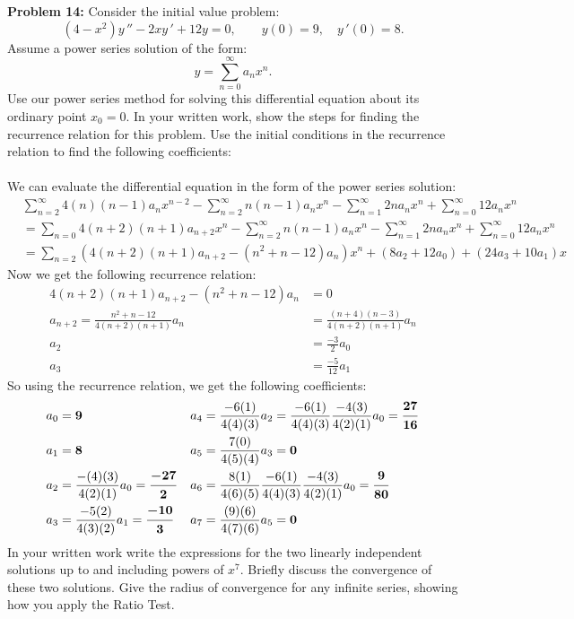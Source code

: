 \documentclass[12pt]{article}
\begin{document}
\noindent \textbf{Problem 14: }Consider the initial value problem:
	$$
	(4 - x^2)y\,'' - 2xy\,' + 12 y = 0, \qquad y(0) = 9, \quad y\,'(0) = 8.
	$$
Assume a power series solution of the form:
	$$
	y = \sum_{n=0}^{\infty} a_n x^n .
	$$
Use our power series method for solving this differential equation about its ordinary point $x_0 = 0$. In your written work, show the steps for finding the recurrence relation for this problem. Use the initial conditions in the recurrence relation to find the following coefficients:		
\\ \\
We can evaluate the differential equation in the form of the power series solution:
	\begin{align*}
		&\sum_{n=2}^{\infty} 4(n)(n-1)a_nx^{n-2} - \sum_{n=2}^{\infty} n(n-1)a_nx^n - \sum_{n=1}^{\infty} 2na_nx^n + \sum_{n=0}^{\infty} 12a_nx^n \\
		&= \sum_{n=0}4(n+2)(n+1)a_{n+2}x^n - \sum_{n=2}^{\infty} n(n-1)a_nx^n - \sum_{n=1}^{\infty} 2na_nx^n + \sum_{n=0}^{\infty} 12a_nx^n \\
		&= \sum_{n=2} (4(n+2)(n+1)a_{n+2} - (n^2 + n - 12)a_n)x^n + (8a_2 + 12a_0) + (24a_3 + 10a_1)x
	\end{align*}
Now we get the following recurrence relation:
	\begin{align*}
		4(n+2)(n+1)a_{n+2} - (n^2 + n - 12)a_n &= 0 \\
		a_{n+2} = \frac{n^2 + n - 12}{4(n+2)(n+1)}a_n &= \frac{(n+4)(n-3)}{4(n+2)(n+1)}a_n \\
		a_2 &= \frac{-3}{2}a_0 \\
		a_3 &= \frac{-5}{12}a_1
	\end{align*}
So using the recurrence relation, we get the following coefficients:
	\begin{align*}
		a_0 &= \text{\boldmath $9$} & a_4 &= \frac{-6(1)}{4(4)(3)}a_2 = \frac{-6(1)}{4(4)(3)}\frac{-4(3)}{4(2)(1)}a_0 = \text{\boldmath $\frac{27}{16}$}\\
		a_1 &= \text{\boldmath $8$} & a_5 &= \frac{7(0)}{4(5)(4)}a_3 =\text{\boldmath $ 0$}\\
		a_2 &= \frac{-(4)(3)}{4(2)(1)}a_0 = \text{\boldmath $\frac{-27}{2}$} & a_6 &= \frac{8(1)}{4(6)(5)}\frac{-6(1)}{4(4)(3)}\frac{-4(3)}{4(2)(1)}a_0 = \text{\boldmath $\frac{9}{80}$} \\
		a_3 &= \frac{-5(2)}{4(3)(2)}a_1 = \text{\boldmath $\frac{-10}{3}$} & a_7 &= \frac{(9)(6)}{4(7)(6)}a_5 =\text{\boldmath $ 0$}
	\end{align*}
\newpage
\noindent In your written work write the expressions for the two linearly independent solutions up to and including powers of $x^7$. Briefly discuss the convergence of these two solutions. Give the radius of convergence for any infinite series, showing how you apply the Ratio Test.
\end{document}
